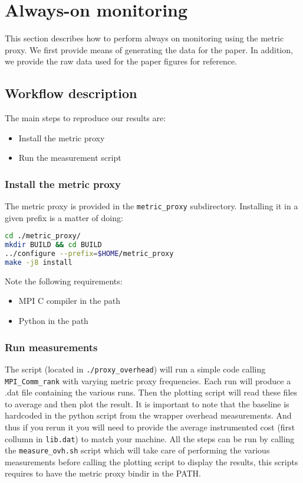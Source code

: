 \section{Always-on monitoring}
\label{sec:monitor}

This section describes how to perform always on monitoring using the metric proxy. We first provide means of generating the data for the paper.
In addition, we provide the raw data used for the paper figures for reference.

\subsection{Workflow description}

The main steps to reproduce our results are:

\begin{itemize}
\item Install the metric proxy
\item Run the measurement script
\end{itemize}

\subsubsection{Install the metric proxy}

The metric proxy is provided in the \texttt{metric\_proxy} subdirectory. Installing it in a given prefix is a matter of doing:

\begin{lstlisting}[language=bash]
cd ./metric_proxy/
mkdir BUILD && cd BUILD
../configure --prefix=$HOME/metric_proxy
make -j8 install
\end{lstlisting}

Note the following requirements:

\begin{itemize}
\item MPI C compiler in the path
\item Python in the path
\end{itemize}

\subsubsection{Run measurements}

The script (located in \texttt{./proxy\_overhead}) will run a simple code calling \texttt{MPI\_Comm\_rank} with varying metric proxy frequencies.
Each run will produce a .dat file containing the various runs. Then the plotting script will read these files to average and then plot the result.
It is important to note that the baseline is hardcoded in the python script from the wrapper overhead measurements. And thus if you rerun it you will
need to provide the average instrumented cost (first collumn in \texttt{lib.dat}) to match your machine. All the steps can be run by calling the \texttt{measure\_ovh.sh} script
which will take care of performing the various measurements before calling the plotting script to display the results, this scripts requires to have the metric proxy bindir in the PATH.

